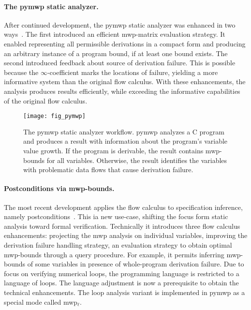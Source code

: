 \paragraph*{The pymwp static analyzer.}
After continued development, the pymwp static analyzer was enhanced in two ways~\cite{aubert2023b}.
The first introduced an efficient mwp-matrix evaluation strategy.
It enabled representing all permissible derivations in a compact form and producing an arbitrary instance of a program bound, if at least one bound exists.
The second introduced feedback about source of derivation failure.
This is possible because the \(\infty\)-coefficient marks the locations of failure, yielding a more informative system than the original flow calculus.
With these enhancements, the analysis produces results efficiently,
while exceeding the informative capabilities of the original flow calculus.

\begin{figure}[t]
\centering
\texttt{[image: fig\_pymwp]}
\caption[The pymwp static analyzer workflow.]{
The pymwp static analyzer workflow.
pymwp analyzes a C program
and produces a result with information about the program's variable value growth.
If the program is derivable, the result contains mwp-bounds for all variables.
Otherwise, the result identifies the variables with problematic data flows that cause derivation failure.
}\label{fig:pymwp}
\end{figure}

\paragraph*{Postconditions via mwp-bounds.}
The most recent development applies the flow calculus to specification inference, namely postconditions~\cite{rusch2025}.
This ia new use-case, shifting the focus form static analysis toward formal verification.
Technically it introduces three flow calculus enhancements:
projecting the mwp analysis on individual variables, improving the derivation failure handling strategy, an evaluation strategy to obtain optimal mwp-bounds through a query procedure.
For example, it permits inferring mwp-bounds of some variables in presence of whole-program derivation failure.
Due to focus on verifying numerical loops, the programming language is restricted to a language of loops.
The language adjustment is now a prerequisite to obtain the technical enhancements.
The loop analysis variant is implemented in pymwp as a special mode called mwp\(_\ell\).

